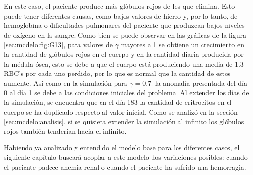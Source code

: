 En este caso, el paciente produce más glóbulos rojos de los que elimina. Esto puede tener diferentes causas, como bajos valores de hierro y, por lo tanto, de hemoglobina o dificultades pulmonares del paciente que produzcan bajos niveles de oxígeno en la sangre. Como bien se puede observar en las gráficas de la figura \ref{sec:modelo:fig:G13}, para valores de $\gamma$ mayores a 1 se obtiene un crecimiento en la cantidad de glóbulos rojos en el cuerpo y en la cantidad diaria producida por la médula ósea, esto se debe a que el cuerpo está produciendo una media de 1.3 RBC's por cada uno perdido, por lo que es normal que la cantidad de estos aumente. Así como en la simulación para $\gamma = 0.7$, la anomalía presentada del día 0 al día 1 se debe a las condiciones iniciales del problema. Al extender los días de la simulación, se encuentra que en el día 183 la cantidad de eritrocitos en el cuerpo se ha duplicado respecto al valor inicial. Como se analizó en la sección \ref{sec:modelo:analisis}, si se quisiera extender la simulación al infinito los glóbulos rojos también tenderían hacia el infinito. 

Habiendo ya analizado y entendido el modelo base para los diferentes casos, el siguiente capítulo buscará acoplar a este modelo dos variaciones posibles: cuando el paciente padece anemia renal o cuando el paciente ha sufrido una hemorragia.
